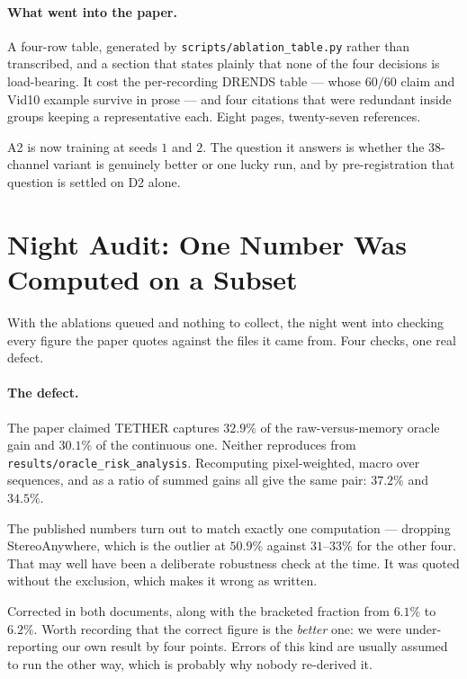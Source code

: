 \documentclass[11pt,a4paper]{article}
\begin{document}
\paragraph{What went into the paper.} A four-row table, generated by
\texttt{scripts/ablation\_table.py} rather than transcribed, and a
section that states plainly that none of the four decisions is
load-bearing. It cost the per-recording DRENDS table --- whose $60/60$
claim and Vid10 example survive in prose --- and four citations that were
redundant inside groups keeping a representative each. Eight pages,
twenty-seven references.

A2 is now training at seeds $1$ and $2$. The question it answers is
whether the $38$-channel variant is genuinely better or one lucky run,
and by pre-registration that question is settled on D2 alone.



\section*{Night Audit: One Number Was Computed on a Subset}

With the ablations queued and nothing to collect, the night went into
checking every figure the paper quotes against the files it came from.
Four checks, one real defect.

\paragraph{The defect.} The paper claimed TETHER captures $32.9\%$ of the
raw-versus-memory oracle gain and $30.1\%$ of the continuous one. Neither
reproduces from \texttt{results/oracle\_risk\_analysis}. Recomputing
pixel-weighted, macro over sequences, and as a ratio of summed gains all
give the same pair: $37.2\%$ and $34.5\%$.

The published numbers turn out to match exactly one computation ---
dropping StereoAnywhere, which is the outlier at $50.9\%$ against
$31$--$33\%$ for the other four. That may well have been a deliberate
robustness check at the time. It was quoted without the exclusion, which
makes it wrong as written.

Corrected in both documents, along with the bracketed fraction from
$6.1\%$ to $6.2\%$. Worth recording that the correct figure is the
\emph{better} one: we were under-reporting our own result by four points.
Errors of this kind are usually assumed to run the other way, which is
probably why nobody re-derived it.
\end{document}
